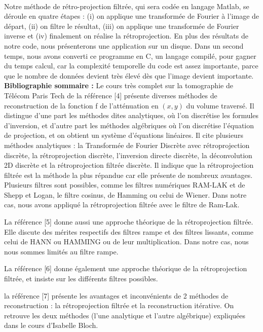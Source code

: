 \documentclass[conference]{IEEEtran}
\begin{document}
\\
Notre méthode de rétro-projection filtrée, qui sera codée en langage Matlab, se déroule en quatre étapes : (i) on applique une transformée de Fourier à l’image de départ, (ii)  on filtre le résultat, (iii) on applique une transformée de Fourier inverse et (iv) finalement on réalise la rétroprojection. En plus des résultats de notre code, nous présenterons une application sur un disque. Dans un second temps, nous avons converti ce programme en C, un langage compilé, pour gagner du temps calcul, car la complexité temporelle du code est assez importante, parce que le nombre de données devient très élevé dès que l’image devient importante.
\\
\textbf{Bibliographie sommaire :}
Le cours très complet sur la tomographie de Télécom Paris Tech de la référence [4] présente diverses méthodes de reconstruction de la fonction f de l'atténuation en $(x,y)$ du volume traversé. Il distingue d’une part les méthodes dites analytiques, où l’on discrétise les formules d’inversion, et d'autre part les méthodes algébriques où l’on discrétise l’équation de projection, et on obtient un système d’équations linéaires. Il cite plusieurs méthodes analytiques : la Transformée de Fourier Discrète avec rétroprojection discrète, la rétroprojection discrète, l’inversion directe discrète, la déconvolution 2D discrète et la rétroprojection filtrée discrète. Il indique que la rétroprojection filtrée est la méthode la plus répandue car elle présente de nombreux avantages. Plusieurs filtres sont possibles, comme les filtres numériques RAM-LAK et de Shepp et Logan, le filtre cosinus, de Hamming ou celui de Wiener. Dans notre cas, nous avons appliqué la rétroprojection filtrée avec le filtre de Ram-Lak.
 
La référence [5] donne aussi une approche théorique de la rétroprojection filtrée. Elle discute des mérites respectifs des filtres rampe et des filtres lissants, comme celui de HANN ou HAMMING ou de leur multiplication. Dans notre cas, nous nous sommes limités au filtre rampe.
 
La référence [6] donne également une approche théorique de la rétroprojection filtrée, et insiste sur les différents filtres possibles.
 
la référence [7] présente les avantages et inconvénients de 2 méthodes de reconstruction : la rétroprojection filtrée et la reconstruction itérative. On retrouve les deux méthodes (l’une analytique et l’autre algébrique) expliquées dans le cours d’Isabelle Bloch.
 
\end{document}
